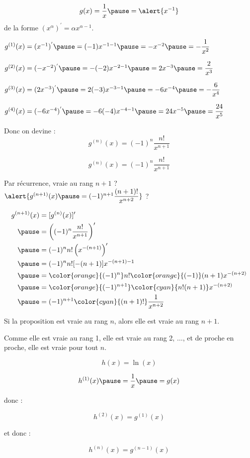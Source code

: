 \documentclass[9pt,handout,professionalfonts,hyperref]{beamer}
\begin{document}
\begin{frame}
$$
g(x)=\dfrac{1}{x}\pause = \alert{x^{-1}}
$$
 \pause
de la forme $(x^\alpha)^{'} = \alpha x^{\alpha-1}$.
\pause
\medskip

$g^{(1)}(x)= (x^{-1})^{'} \pause = (-1)x^{-1-1} \pause = -x^{-2} \pause = -\dfrac{1}{x^2}$
 \pause
\medskip

$g^{(2)}(x)=(-x^{-2})^{'} \pause =-(-2)x^{-2-1} \pause =2x^{-3}\pause = \dfrac{2}{x^3}$
 \pause
\medskip

$g^{(3)}(x)= (2x^{-3})^{'}\pause = 2 (-3)x^{-3-1}\pause = -6x^{-4}\pause =-\dfrac{6}{x^4}$
 \pause
\medskip

$g^{(4)}(x)=(-6x^{-4})^{'} \pause = -6(-4)x^{-4-1} \pause = 24x^{-5} \pause = \dfrac{24}{x^5}$
 \pause
\medskip

Donc on devine : $$g^{(n)}(x)=(-1)^n\dfrac{n!}{x^{n+1}}$$

\end{frame}

\begin{frame}
$$g^{(n)}(x)=(-1)^n\dfrac{n!}{x^{n+1}}$$
 \pause
\medskip

Par récurrence, vraie au rang $n+1$ ? \pause $\alert{g^{(n+1)}(x) \pause =(-1)^{n+1}\dfrac{(n+1)!}{x^{n+2}}}$ ?
\pause
\medskip

\[\begin{aligned}
g^{(n+1)}(x)
& =[g^{(n)}(x)]' \\
\pause & = \left((-1)^n\dfrac{n!}{x^{n+1}}\right)'\\
\pause & = (-1)^n n! \left(x^{-(n+1)}\right)'\\
\pause & =(-1)^n n! [-(n+1)] x^{-(n+1)-1} \\
\pause & = {\color{orange}{(-1)^n}} n! {\color{orange}{(-1)}}(n+1) x^{-(n+2)} \\
\pause & ={\color{orange}{(-1)^{n+1}}} {\color{cyan}{n!(n+1)}} x^{-(n+2)} \\
\pause & =(-1)^{n+1} {\color{cyan}{(n+1)!}} \dfrac{1}{x^{n+2}} \\
\end{aligned}\]\newline

Si la proposition est vraie au rang $n$, alors elle est vraie au rang $n+1$.

Comme elle est vraie au rang 1, elle est vraie au rang 2, $\dots$, et de proche en proche, elle est vraie pour tout $n$.

\end{frame}

\begin{frame}
$$
h(x)=\ln(x)
$$
\pause
\medskip

$$h^{(1)}(x)\pause =\dfrac{1}{x}\pause =g(x)$$

\pause donc :

$$h^{(2)}(x)=g^{(1)}(x)$$

\pause et donc :

$$h^{(n)}(x)=g^{(n-1)}(x)$$

\end{frame}
\end{document}

